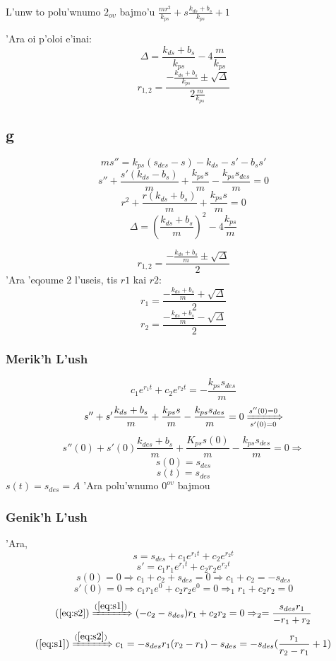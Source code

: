 \documentclass[a4paper]{article}
\begin{document}
        L'unw to polu'wnumo $2_{o\upsilon}$ bajmo'u $\frac{mr^2}{k_{ps}}+s\frac{k_{ds}+b_s}{k_{ps}}+1$ \par
        'Ara oi p'oloi e'inai:
        \[\Delta=\frac{k_{ds}+b_s}{k_{ps}}-4\frac{m}{k_{ps}}\]
        \[r_{1,2}=\frac{-\frac{k_{ds}+b_s}{k_{ps}}\pm \sqrt{\Delta}}{2\frac{m}{k_{ps}}}\]

        \subsection{g}
        \[ms''=k_{ps}(s_{des}-s)-k_{ds}-s'-b_ss'\]
        \[s''+\frac{s'(k_{ds}-b_s)}{m}+\frac{k_{ps}s}{m}-\frac{k_{ps}s_{des}}{m}=0\]
        \[r^2+\frac{r(k_{ds}+b_s)}{m}+\frac{k_{ps}s}{m}=0\]
        \[\Delta=(\frac{k_{ds}+b_s}{m})^2-4\frac{k_{ps}}{m}\]
        
        \[r_{1,2}=\frac{-\frac{k_{ds}+b_s}{m}\pm\sqrt{\Delta}}{2}\]
        'Ara 'eqoume 2 l'useis, tis $r1$ kai $r2$:
        \[r_1=\frac{-\frac{k_{ds}+b_s}{m}+\sqrt{\Delta}}{2}\]
        \[r_2=\frac{-\frac{k_{ds}+b_s}{m}-\sqrt{\Delta}}{2}\]
        \subsubsection{Merik'h L'ush}
        \[c_1e^{r_1t}+c_2e^{r_2t}=-\frac{k_{ps}s_{des}}{m}\]
        \[s''+s'\frac{k_{ds}+b_s}{m}+\frac{k_{ps}s}{m}-\frac{k_{ps}s_{des}}{m}=0\xRightarrow[s'(0)=0]{s''(0)=0}\]
        \[s''(0)+s'(0)\frac{k_{des}+b_s}{m}+\frac{K_{ps}s(0)}{m}-\frac{k_{ps}s_{des}}{m}=0\Rightarrow\]
        \[s(0)=s_{des}\]
        \[s(t)=s_{des}\]
        $s(t)=s_{des}=A$ 'Ara polu'wnumo $0^{o\upsilon}$ bajmou
        \subsubsection{Genik'h L'ush}
        'Ara,
        \[s=s_{des}+c_1e^{r_1t}+c_2e^{r_2t}\]
        \[s'=c_1r_1e^{r_1t}+c_2r_2e^{r_2t}\]
        \begin{equation}
        s(0)=0\Rightarrow c_1+c_2+s_{des}=0\Rightarrow c_1+c_2=-s_{des}
        \label{eq:s1}
        \end{equation}
        \begin{equation}
            s'(0)=0\Rightarrow c_1r_1e^0+c_2r_2e^0=0\Rightarrow_1r_1+c_2r_2=0
            \label{eq:s2}
        \end{equation}
        \[(\ref{eq:s2})\xRightarrow{(\ref{eq:s1})}(-c_2-s_{des})r_1+c_2r_2=0\Rightarrow_2=\frac{s_{des}r_1}{-r_1+r_2}\]
        \[(\ref{eq:s1})\xRightarrow{(\ref{eq:s2})}c_1=-s_{des}r_1(r_2-r_1)-s_{des}=-s_{des}(\frac{r_1}{r_2-r_1}+1)\]
\end{document}

